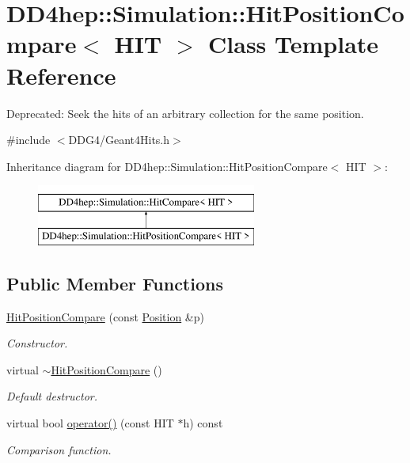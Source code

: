 \hypertarget{struct_d_d4hep_1_1_simulation_1_1_hit_position_compare}{}\section{D\+D4hep\+:\+:Simulation\+:\+:Hit\+Position\+Compare$<$ H\+IT $>$ Class Template Reference}
\label{struct_d_d4hep_1_1_simulation_1_1_hit_position_compare}


Deprecated\+: Seek the hits of an arbitrary collection for the same position.  




{\ttfamily \#include $<$D\+D\+G4/\+Geant4\+Hits.\+h$>$}

Inheritance diagram for D\+D4hep\+:\+:Simulation\+:\+:Hit\+Position\+Compare$<$ H\+IT $>$\+:\begin{figure}[H]
\begin{center}
\leavevmode
\includegraphics[height=2.000000cm]{struct_d_d4hep_1_1_simulation_1_1_hit_position_compare}
\end{center}
\end{figure}
\subsection*{Public Member Functions}
\begin{DoxyCompactItemize}
\item 
\hyperlink{struct_d_d4hep_1_1_simulation_1_1_hit_position_compare_aa1d22cc065ef2af450b0d30188f1a1a7}{Hit\+Position\+Compare} (const \hyperlink{namespace_d_d4hep_1_1_geometry_a55083902099d03506c6db01b80404900}{Position} \&p)
\begin{DoxyCompactList}\small\item\em Constructor. \end{DoxyCompactList}\item 
virtual \hyperlink{struct_d_d4hep_1_1_simulation_1_1_hit_position_compare_a0fa91c4c8ba1e1e4db40ed13c16421e6}{$\sim$\+Hit\+Position\+Compare} ()
\begin{DoxyCompactList}\small\item\em Default destructor. \end{DoxyCompactList}\item 
virtual bool \hyperlink{struct_d_d4hep_1_1_simulation_1_1_hit_position_compare_aa73aacb44d5a56d3485dd58e38bc505f}{operator()} (const H\+IT $\ast$h) const
\begin{DoxyCompactList}\small\item\em Comparison function. \end{DoxyCompactList}\end{DoxyCompactItemize}
